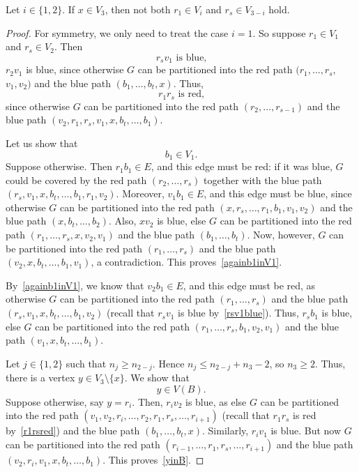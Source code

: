 \documentclass[a4paper,10pt]{article}
\begin{document}
\begin{claim}\label{xV3-c}
Let $i\in\{1,2\}$. If $x \in V_3$, then not both $r_1\in V_i$ and $r_s\in V_{3-i}$ hold.
\end{claim}
\begin{proof}
For symmetry, we only need to treat the case $i=1$. So suppose 
$r_1\in V_1$ and ${r_s \in V_2}$.
Then 
\begin{equation}\label{rsv1blue}
\text{$r_sv_1$ is blue,}
\end{equation}
$r_2v_1$ is blue, since otherwise $G$ can be partitioned into the red path $(r_1,\ldots,r_s,$ $v_1,v_2)$ and the blue path $(b_1,\ldots,b_t,x)$.
Thus, 
 \begin{equation}\label{r1rsred}
\text{$r_1r_s$ is red,}
\end{equation}
 since otherwise $G$ can be partitioned into the red path $(r_2,\ldots,r_{s-1})$ and the blue path $(v_2,r_1,r_s,v_1,x,b_t,\ldots,b_1)$.

Let us show that
 \begin{equation}\label{againb1inV1}
\text{$b_1 \in V_1$.}
\end{equation}
Suppose otherwise.
Then $r_1b_1 \in E$, and this edge must be red: if it was blue, $G$ could be covered by the red path $(r_2,\ldots,r_s)$ together with the blue path $(r_s,v_1,x,b_t,\ldots,b_1,r_1,v_2)$.
Moreover, $v_1b_1 \in E$, and this edge must be blue, since otherwise $G$ can be partitioned into the red path $(x,r_s,\ldots,r_1,b_1,v_1,v_2)$ and the blue path $(x,b_t,\ldots,b_2)$.
Also, $xv_2$ is blue, else $G$ can be partitioned into the red path $(r_1,\ldots,r_s,x,v_2,v_1)$ and the blue path $(b_1,\ldots,b_t)$.
Now, however, $G$ can be partitioned into the red path $(r_1,\ldots,r_s)$ and the blue path $(v_2,x,b_t,\ldots,b_1,v_1)$, a contradiction. This proves~\eqref{againb1inV1}.

By~\eqref{againb1inV1}, we know that
$v_2b_1 \in E$, and this edge must be red, as otherwise $G$ can be partitioned into the red path $(r_1,\ldots,r_s)$ and the blue path $(r_s,v_1,x,b_t,\ldots,b_1,v_2)$ (recall that $r_sv_1$ is blue by~\eqref{rsv1blue}).
Thus, $r_sb_1$ is blue, else $G$ can be partitioned into the red path $(r_1,\ldots,r_s,b_1,v_2,v_1)$ and the blue path $(v_1,x,b_t,\ldots,b_1)$.

Let $j \in \{1,2\}$ such that $n_j \ge n_{2-j}$.
Hence $n_j \le n_{2-j} + n_3 - 2$, so $n_3 \ge 2$.
Thus, there is a vertex $y \in V_3 \setminus \{x\}$. We show that
 \begin{equation}\label{yinB}
\text{$y \in V(B)$.}
\end{equation}
Suppose otherwise, say $y = r_i$.
Then, $r_iv_2$ is blue, as else $G$ can be partitioned into the red path $(v_1,v_2,r_i,\ldots,r_2,r_1,r_s,\ldots,r_{i+1})$ (recall that $r_1r_s$ is red by~\eqref{r1rsred}) and the blue path $(b_1,\ldots,b_t,x)$.
Similarly, $r_iv_1$ is blue.
But now $G$ can be partitioned into the red path $(r_{i-1},\ldots,r_1,r_s,\ldots,r_{i+1})$ and the blue path $(v_2,r_i,v_1,x,b_t,\ldots,b_1)$. This proves~\eqref{yinB}.


\end{proof}
\end{document}
